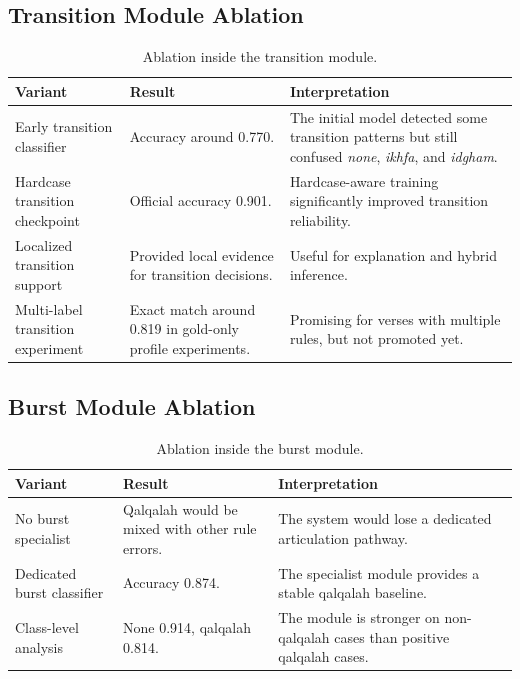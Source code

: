 \subsection{Transition Module Ablation}

\begin{table}[H]
\centering
\small
\begin{tabularx}{\textwidth}{p{} p{} X}
\toprule
\textbf{Variant} & \textbf{Result} & \textbf{Interpretation} \\
\midrule
Early transition classifier &
Accuracy around 0.770. &
The initial model detected some transition patterns but still confused
\textit{none}, \textit{ikhfa}, and \textit{idgham}. \\
\midrule
Hardcase transition checkpoint &
Official accuracy 0.901. &
Hardcase-aware training significantly improved transition reliability. \\
\midrule
Localized transition support &
Provided local evidence for transition decisions. &
Useful for explanation and hybrid inference. \\
\midrule
Multi-label transition experiment &
Exact match around 0.819 in gold-only profile experiments. &
Promising for verses with multiple rules, but not promoted yet. \\
\bottomrule
\end{tabularx}
\caption{Ablation inside the transition module.}
\label{tab:transition_ablation}
\end{table}

\subsection{Burst Module Ablation}

\begin{table}[H]
\centering
\small
\begin{tabularx}{\textwidth}{p{} p{} X}
\toprule
\textbf{Variant} & \textbf{Result} & \textbf{Interpretation} \\
\midrule
No burst specialist &
Qalqalah would be mixed with other rule errors. &
The system would lose a dedicated articulation pathway. \\
\midrule
Dedicated burst classifier &
Accuracy 0.874. &
The specialist module provides a stable qalqalah baseline. \\
\midrule
Class-level analysis &
None 0.914, qalqalah 0.814. &
The module is stronger on non-qalqalah cases than positive qalqalah cases. \\
\bottomrule
\end{tabularx}
\caption{Ablation inside the burst module.}
\label{tab:burst_ablation}
\end{table}

